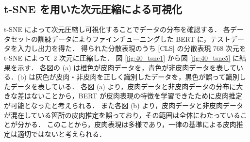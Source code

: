 \afterpage{\clearpage}
\clearpage

\subsection{t-SNE を用いた次元圧縮による可視化}

t-SNE \cite{JMLR:v9:vandermaaten08a} によって次元圧縮し可視化することでデータの分布を確認する．
各データセットの訓練データによりファインチューニングした BERT に，テストデータを入力し出力を得た．
得られた分散表現のうち [CLS] の分散表現 768 次元を t-SNE によって 2 次元に圧縮した．
図 \ref{fig:40_tsne1} から図 \ref{fig:40_tsne5} に結果を示す．
各図の (a) は橙色が皮肉データを，青色が非皮肉データを表している．(b) は灰色が皮肉・非皮肉を正しく識別したデータを，黒色が誤って識別したデータを表している．
各図 (a) より，皮肉データと非皮肉データの分布に大きな差はないことから，BERT が皮肉表現の特徴を学習できたために皮肉推定が可能となったと考えられる．
また各図 (b) より，皮肉データと非皮肉データが混在している箇所の皮肉推定を誤っており，その範囲は全体にわたっていることが分かる．
このことから，皮肉表現は多様であり，一律の基準による皮肉推定は適切ではないと考えられる．


